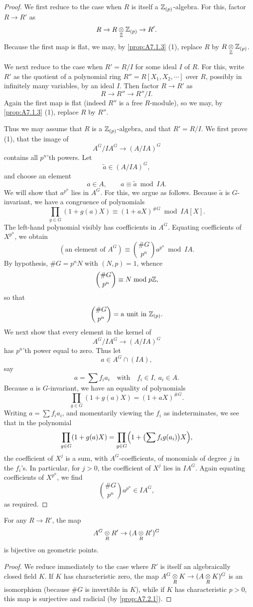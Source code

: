 \begin{proof}
We first reduce to the case when $R$ is itself a $\mathbb{Z}_{(p)}$-algebra. For this, factor $R \to R'$ as
\[
R \to R \underset{\mathbb{Z}}{\otimes} \mathbb{Z}_{(p)} \to R' .
\]
Because the first map is flat, we may, by \ref{prop:A7.1.3} (1), replace $R$ by $R \underset{\mathbb{Z}}{\otimes} \mathbb{Z}_{(p)}$.

We next reduce to the case when $R' = R/I$ for some ideal $I$ of $R$. For this, write $R'$ as the quotient of a polynomial ring $R'' = R[X_1,X_2,\cdots]$ over $R$, possibly in infinitely many variables, by an ideal $I$. Then factor $R \to R'$ as
\[
R \to R'' \to R''/I .
\]
Again the first map is flat (indeed $R''$ is a free $R$-module), so we may, by \ref{prop:A7.1.3} (1), replace $R$ by $R''$.

Thus we may assume that $R$ is a $\mathbb{Z}_{(p)}$-algebra, and that $R' = R/I$. We first prove (1), that the image of
\[
A^G/IA^G \to (A/IA)^G
\]
contains all $p^n$'th powers. Let
\[
\tilde a \in (A/IA)^G ,
\]
and choose an element
\[
a \in A , \qquad a \equiv \tilde a \bmod IA .
\]
We will show that $a^{p^n}$ lies in $A^G$. For this, we argue as follows. Because $\tilde a$ is $G$-invariant, we have a congruence of polynomials
\[
\prod_{g \in G} (1 + g(a)X) \equiv (1 + aX)^{\#G} \bmod IA[X] .
\]
The left-hand polynomial visibly has coefficients in $A^G$. Equating coefficients of $X^{p^n}$, we obtain
\[
(\text{an element of } A^G) \equiv \binom{\#G}{p^n} a^{p^n} \bmod IA .
\]
By hypothesis, $\#G = p^n N$ with $(N,p) = 1$, whence
\[
\binom{\#G}{p^n} \equiv N \bmod p\mathbb{Z} ,
\]
so that
\[
\binom{\#G}{p^n} = \text{a unit in } \mathbb{Z}_{(p)} .
\]
We next show that every element in the kernel of
\[
A^G/IA^G \to (A/IA)^G
\]
has $p^n$'th power equal to zero. Thus let
\[
a \in A^G \cap (IA) ,
\]
say
\[
a = \sum f_i a_i \quad \text{with} \quad f_i \in I,\ a_i \in A .
\]
Because $a$ is $G$-invariant, we have an equality of polynomials
\[
\prod_{g \in G} (1 + g(a)X) = (1 + aX)^{\#G} .
\]
Writing $a = \sum f_i a_i$, and momentarily viewing the $f_i$ as indeterminates, we see that in the polynomial
\[
\prod_{g \in G} (1 + g(a)X) = \prod_{g \in G} \Bigl(1 + \bigl(\sum f_i g(a_i)\bigr)X\Bigr) ,
\]
the coefficient of $X^j$ is a sum, with $A^G$-coefficients, of monomials of degree $j$ in the $f_i$'s. In particular, for $j > 0$, the coefficient of $X^j$ lies in $IA^G$. Again equating coefficients of $X^{p^n}$, we find
\[
\binom{\#G}{p^n} a^{p^n} \in IA^G ,
\]
as required.
\end{proof}

\begin{appcor}\label{cor:A7.2.2}
For any $R \to R'$, the map
\[
A^G \underset{R}{\otimes} R' \to (A \underset{R}{\otimes} R')^G
\]
is bijective on geometric points.
\end{appcor}

\begin{proof}
We reduce immediately to the case where $R'$ is itself an algebraically closed field $K$. If $K$ has characteristic zero, the map $A^G \underset{R}{\otimes} K \to (A \underset{R}{\otimes} K)^G$ is an isomorphism (because $\#G$ is invertible in $K$), while if $K$ has characteristic $p > 0$, this map is surjective and radicial (by \ref{prop:A7.2.1}).
\end{proof}

